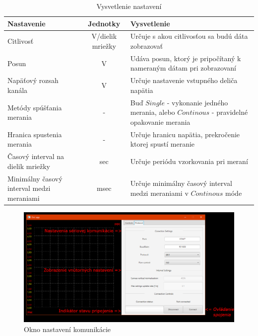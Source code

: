 \documentclass[main.tex]{subfiles}
\begin{document}
		\begin{table}
			\begin{tabular}{p{5cm}|c|p{5cm}}
				Nastavenie & Jednotky & Vysvetlenie \\
				\hline
				Citlivosť & V/dielik mriežky & Určuje s akou citlivosťou sa budú dáta zobrazovať \\
				Posun & V & Udáva posun, ktorý je pripočítaný k nameraným dátam pri zobrazovaní \\ 
				Napäťový rozsah kanála & V & Určuje nastavenie vstupného deliča napätia \\ 
				Metódy spúšťania merania & - & Buď $Single$ - vykonanie jedného merania, alebo $Continous$ - pravidelné opakovanie merania\\ 
				Hranica spustenia merania & - & Určuje hranicu napätia, prekročenie ktorej spustí meranie\\ 
				Časový interval na dielik mriežky & sec & Určuje periódu vzorkovania pri meraní \\
				Minimálny časový interval medzi meraniami & msec & Určuje minimálny časový interval medzi meraniami v $Continous$ móde \\
			\end{tabular}
			\caption{Vysvetlenie nastavení}
			\label{tab:GUIVysvetlenieNastaveni}
		\end{table}
		\begin{figure}
			\centering
			\includegraphics[width=\linewidth]{../Obrazky/GUINastaveniaKomunikacie}
			\caption{Okno nastavení komunikácie}
			\label{fig:GUINastaveniaKomunikacie}
		\end{figure}
		\FloatBarrier
\end{document}
